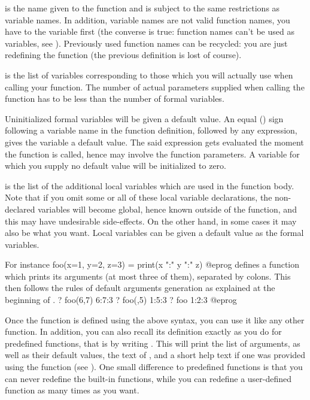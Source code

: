  is the name given to the function and is subject to the same
restrictions as variable names. In addition, variable names are not valid
function names, you have to  the variable first (the converse is
true: function names can't be used as variables, see ).
Previously used function names can be recycled: you are just redefining the
function (the previous definition is lost of course).

 is the list of variables corresponding to
those which you will actually use when calling your function. The number of
actual parameters supplied when calling the function has to be less than the
number of formal variables.

Uninitialized formal variables will be given a default value. An equal
(\kbd{=}) sign following a variable name in the function definition,
followed by any expression, gives the variable a default value. The
said expression gets evaluated the moment the function is called, hence may
involve the function parameters. A variable for which you supply no default
value will be initialized to zero.

 is the list of the additional local variables
which are used in the function body. Note that if you omit some or all of
these local variable declarations, the non-declared variables will become
global, hence known outside of the function, and this may have undesirable
side-effects. On the other hand, in some cases it may also be what you want.
Local variables can be given a default value as the formal variables.

 For instance
\bprog
  foo(x=1, y=2, z=3) = print(x ":" y ":" z)
@eprog
\noindent defines a function which prints its arguments (at most three of
them), separated by colons. This then follows the rules of default
arguments generation as explained at the beginning of
.
\bprog
? foo(6,7)
6:7:3
? foo(,5)
1:5:3
? foo
1:2:3
@eprog

  Once the function is defined using the above syntax, you can use it like
any other function. In addition, you can also recall its definition exactly
as you do for predefined functions, that is by writing .
This will print the list of arguments, as well as their default values,
the text of , and a short help text if one was provided using
the  function (see ). One small difference
to predefined functions is that you can never redefine the built-in
functions, while you can redefine a user-defined function as many times
as you want.

